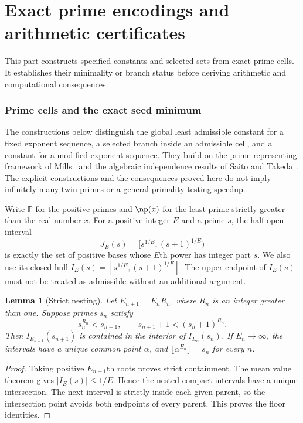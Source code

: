 \documentclass[11pt,a4paper]{article}
\newtheorem{lemma}[theorem]{Lemma}
\theoremstyle{definition}
\theoremstyle{remark}
\numberwithin{equation}{section}
\begin{document}
\setcounter{table}{0}
\renewcommand{\theHtable}{\arabic{table}}

\clearpage
\part{Exact prime encodings and arithmetic certificates}\label{part:encoding}
This part constructs specified constants and selected sets from exact prime cells. It establishes their minimality or branch status before deriving arithmetic and computational consequences.

\section{Prime cells and the exact seed minimum}
The constructions below distinguish the global least admissible constant
for a fixed exponent sequence, a selected branch inside an admissible
cell, and a constant for a modified exponent sequence. They build on the
prime-representing framework of Mills~\cite{Mills1947} and the algebraic
independence results of Saito and Takeda~\cite{SaitoTakeda2022}.
The explicit constructions and the consequences proved here do not imply
infinitely many twin primes or a general primality-testing speedup.

Write $\mathbb P$ for the positive primes and $\np(x)$ for the least prime strictly greater than the real number $x$. For a positive integer $E$ and a prime $s$, the half-open interval
\[
J_E(s)=[s^{1/E},(s+1)^{1/E})
\]
is exactly the set of positive bases whose $E$th power has integer part $s$. We also use its closed hull $I_E(s)=[s^{1/E},(s+1)^{1/E}]$. The upper endpoint of $I_E(s)$ must not be treated as admissible without an additional argument.

\begin{lemma}[Strict nesting]\label{enc:lem:nesting}
Let $E_{n+1}=E_nR_n$, where $R_n$ is an integer greater than one. Suppose primes $s_n$ satisfy
\[
s_n^{R_n}<s_{n+1},\qquad s_{n+1}+1<(s_n+1)^{R_n}.
\]
Then $I_{E_{n+1}}(s_{n+1})$ is contained in the interior of $I_{E_n}(s_n)$. If $E_n\to\infty$, the intervals have a unique common point $\alpha$, and $\lfloor\alpha^{E_n}\rfloor=s_n$ for every $n$.
\end{lemma}
\begin{proof}
Taking positive $E_{n+1}$th roots proves strict containment. The mean value theorem gives $|I_E(s)|\le1/E$. Hence the nested compact intervals have a unique intersection. The next interval is strictly inside each given parent, so the intersection point avoids both endpoints of every parent. This proves the floor identities.
\end{proof}
\end{document}
